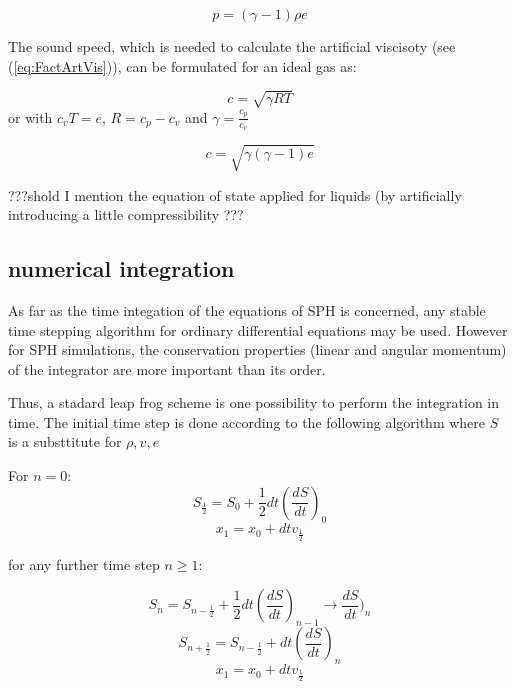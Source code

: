 \documentclass{report}
\begin{document}
\begin{equation}
 p=(\gamma-1)\rho e
\end{equation}

The sound speed, which is needed to calculate the artificial viscisoty (see (\ref{eq:FactArtVis})), can be formulated for an ideal gas as:

\begin{equation}
 c=\sqrt{\gamma R T}
\end{equation}
or with $c_v T=e$, $R=c_p-c_v$ and $\gamma=\frac{c_p}{c_v}$

\begin{equation}
 c=\sqrt{\gamma(\gamma-1)e}
\end{equation}


???shold I mention the equation of state applied for liquids (by artificially
introducing a little compressibility \cite{Monaghan1994,Monaghan2005}???




\subsection{numerical integration}
\label{sec:numIntegr}

As far as the time integation of the equations of SPH is concerned, any stable
time stepping algorithm for ordinary differential equations may be
used\cite{Monaghan2005}. However for SPH simulations, the conservation properties
(linear and angular momentum) of the integrator are more important than its
order\cite{Monaghan2005}.

Thus, a stadard leap frog scheme is one possibility to perform the integration in
time. The initial time step is done according to the following algorithm where
$S$ is a substtitute for $\rho,v,e$

For $n=0$:
\begin{equation}
S_{\frac{1}{2}}=S_0+\frac{1}{2}dt\left(\frac{dS}{dt}\right)_0
\end{equation}
\begin{equation}
x_1=x_0+dt v_{\frac{1}{2}}
\end{equation}

for any further time step $n\ge1$:

\begin{equation}
S_n=S_{n-\frac{1}{2}}+\frac{1}{2}dt\left(\frac{dS}{dt}\right)_{n-1} \rightarrow
\frac{dS}{dt})_n 
\end{equation}
\begin{equation}
S_{n+\frac{1}{2}}=S_{n-\frac{1}{2}}+dt\left(\frac{dS}{dt}\right)_n 
\end{equation}
\begin{equation}
x_1=x_0+dt v_{\frac{1}{2}}
\end{equation}
\end{document}

